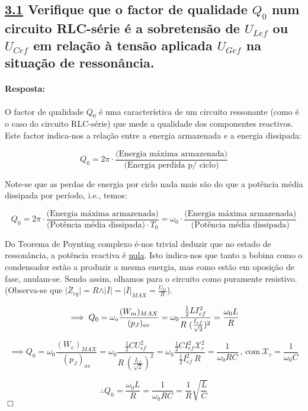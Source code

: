 \subsection*{\underline{3.1} Verifique que o factor de qualidade $Q_0$ num circuito RLC-série é a sobretensão de $U_{Lef}$ ou $U_{Cef}$ em relação à tensão aplicada $U_{Gef}$ na situação de ressonância.}
\label{subsection3_1}
\paragraph{Resposta:}
O factor de qualidade $Q_0$  é uma característica de um circuito ressonante (como é o caso do circuito RLC-série) que mede a qualidade dos componentes reactivos. Este factor indica-nos a relação entre a energia armazenada e a energia dissipada:

$$ Q_0 = 2\pi \cdot \frac{\text{(Energia máxima armazenada)}}{\text{(Energia perdida p/ ciclo)}} $$

Note-se que as perdas de energia por ciclo nada mais são do que a potência média dissipada por período, i.e., temos:

$$ Q_0 = 2\pi \cdot \frac{\text{(Energia máxima armazenada)}}{\text{(Potência média dissipada)}\cdot T_0} = \omega_0 \cdot \frac{\text{(Energia máxima armazenada)}}{\text{(Potência média dissipada)}}$$

Do Teorema de Poynting complexo é-nos trivial deduzir que no estado de ressonância, a potência reactiva é \underline{nula}. Isto indica-nos que tanto a bobina como o condensador estão a produzir a mesma energia, mas como estão em oposição de fase, anulam-se. Sendo assim, olhamos para o circuito como puramente resistivo. (Observa-se que $\vert \bar{Z}_{eq}\vert = R \land \vert \bar{I}\vert = \vert\bar{I}\vert_{MAX} = \frac{U_{G}}{R}$).

$$ 
\implies Q_0 = \omega_o \frac{(W_m)_{MAX}}{(p_J)_{av}} = \omega_0 \frac{\frac{1}{2}LI_{ef}^2}{R\ (\frac{I_{ef}}{\sqrt{2}})^2} = \frac{\omega_0 L}{R}\\ 
$$

$$
\implies Q_0 = \omega_0 \frac{(W_e)_{MAX}}{(p_J)_{av}} = \omega_0 \frac{\frac{1}{2}C U_{ef}^2}{R\ (\frac{I_{ef}}{\sqrt{2}})^2} = \omega_0 \frac{\frac{1}{2} C I_{ef}^2 \mathcal{X}_c^2}{\frac{1}{2}I_{ef}^2\ R} = \frac{1}{\omega_0 RC}\ \text{, com}\ \mathcal{X}_c = \frac{1}{\omega_0 C}
$$

$$
\therefore Q_0 = \frac{\omega_0 L}{R} = \frac{1}{\omega_0 RC} = \frac{1}{R}\sqrt{\frac{L}{C}}
$$
\hfill \ensuremath{\Box}

